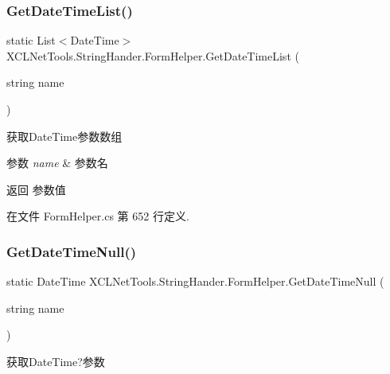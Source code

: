 \subsubsection{\texorpdfstring{Get\+Date\+Time\+List()}{GetDateTimeList()}}
{\footnotesize\ttfamily static List$<$Date\+Time$>$ X\+C\+L\+Net\+Tools.\+String\+Hander.\+Form\+Helper.\+Get\+Date\+Time\+List (\begin{DoxyParamCaption}\item[{string}]{name }\end{DoxyParamCaption})\hspace{0.3cm}{\ttfamily [static]}}



获取\+Date\+Time参数数组 


\begin{DoxyParams}{参数}
{\em name} & 参数名\\
\hline
\end{DoxyParams}
\begin{DoxyReturn}{返回}
参数值
\end{DoxyReturn}


在文件 Form\+Helper.\+cs 第 652 行定义.

\mbox{\label{class_x_c_l_net_tools_1_1_string_hander_1_1_form_helper_a420660ded9f4960446f03cede154198b}} 
\subsubsection{\texorpdfstring{Get\+Date\+Time\+Null()}{GetDateTimeNull()}\hspace{0.1cm}{\footnotesize\ttfamily [1/2]}}
{\footnotesize\ttfamily static Date\+Time X\+C\+L\+Net\+Tools.\+String\+Hander.\+Form\+Helper.\+Get\+Date\+Time\+Null (\begin{DoxyParamCaption}\item[{string}]{name }\end{DoxyParamCaption})\hspace{0.3cm}{\ttfamily [static]}}



获取\+Date\+Time?参数 



